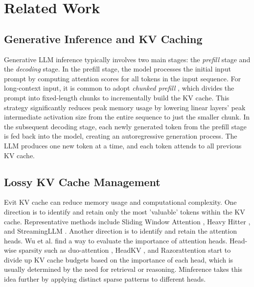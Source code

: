 \section{Related Work}


\subsection{Generative Inference and KV Caching}

Generative LLM inference typically involves two main stages: the  \emph{prefill} stage and the  \emph{decoding} stage. In the prefill stage, the model processes the initial input prompt by computing attention scores for all tokens in the input sequence. 
For long-context input, it is common to adopt \emph{chunked prefill} \cite{agrawal2024taming}, which divides the prompt into fixed-length chunks to incrementally build the KV cache. This strategy significantly reduces peak memory usage by lowering linear layers' peak intermediate activation size from the entire sequence to just the smaller chunk. 
In the subsequent decoding stage, each newly generated token from the prefill stage is fed back into the model, creating an autoregressive generation process. The LLM produces one new token at a time, and each token attends to all previous KV cache. %


\subsection{Lossy KV Cache Management} Evit KV cache can reduce memory usage and computational complexity. One direction is to identify and retain only the most 'valuable' tokens within the KV cache. Representative methods include Sliding Window Attention \cite{beltagy2020longformer}, Heavy Hitter \cite{zhang2024h2o}, and StreamingLLM \cite{xiao2023efficient}. Another direction is to identify and retain the attention heads. Wu et al. \cite{wu2024retrieval} find a way to evaluate the importance of attention heads. Head-wise sparsity such as duo-attention \cite{xiao2024duoattention}, HeadKV \cite{fu2024not}, and Razorattention \cite{tang2024razorattention} start to divide up KV cache budgets based on the importance of each head, which is usually determined by the need for retrieval or reasoning.  Minference \cite{jiang2024minference} takes this idea further by applying distinct sparse patterns to different heads.

